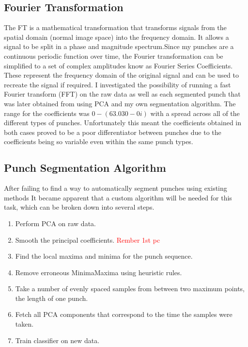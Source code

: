 \subsection{Fourier Transformation}
The FT is a mathematical transformation that transforms signals from the spatial domain (normal image space) into the frequency domain. It allows a signal to be split in a phase and magnitude spectrum.Since my punches are a continuous periodic function over time, the Fourier transformation can be simplified to a set of complex amplitudes know as Fourier Series Coefficients. These represent the frequency domain of the original signal and can be used to recreate the signal if required. I investigated the possibility of running a fast Fourier transform (FFT) on the raw data as well as each segmented punch that was later obtained from using PCA and my own segmentation algorithm. The range for the coefficients was $0 - (63.030 - 0i)$ with a spread across all of the different types of punches. 
Unfortunately this meant the coefficients obtained in both cases proved to be a poor differentiator between punches due to the coefficients being so variable even within the same punch types.

\subsection{Punch Segmentation Algorithm}
After failing to find a way to automatically segment punches using existing methods It became apparent that a custom algorithm will be needed for this task, which can be broken down into several steps.

\begin{enumerate}[noitemsep]
  \item Perform PCA on raw data.
  \item Smooth the principal coefficients. \textcolor{red}{Rember 1st pc}
  \item Find the local maxima and minima for the punch sequence.
  \item Remove erroneous Minima\/Maxima using heuristic rules.
  \item Take a number of evenly spaced samples from between two maximum points, the length of one punch.
  \item Fetch all PCA components that correspond to the time the samples were taken.
  \item Train classifier on new data.
\end{enumerate}

